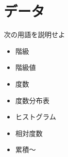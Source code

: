 \documentclass[10pt]{jsarticle}
\begin{document}
\section{データ}
\begin{itembox}[l]{次の用語を説明せよ}
	\begin{Large}
		\begin{itemize}
			\item  階級
			\item 階級値
			\item 度数
			\item 度数分布表
			\item ヒストグラム
			\item 相対度数
			\item 累積〜
		\end{itemize}
	\end{Large}
\end{itembox}
\end{document}
